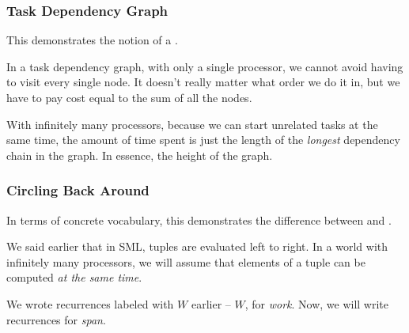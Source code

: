 \documentclass[aspectratio=169]{beamer}
\begin{document}
\begin{frame}[fragile]
  \frametitle{ Task Dependency Graph }

  This demonstrates the notion of a .

  \pause
  \vspace{\fill}


  \pause
  \vspace{\fill}

  In a task dependency graph, with only a single processor, we cannot avoid having to visit every single
  node. It doesn't really matter what order we do it in, but we have to pay cost equal to the sum of all
  the nodes.

  \pause
  \vspace{\fill}

  With infinitely many processors, because we can start unrelated tasks at the same time, the amount of time
  spent is just the length of the \textit{longest} dependency chain in the graph. In essence, the height
  of the graph.
\end{frame}

\begin{frame}[fragile]
  \frametitle{ Circling Back Around }

  In terms of concrete vocabulary, this demonstrates the difference between  and .

  \pause
  \vspace{\fill}


  \pause
  \vspace{\fill}


  \pause
  \vspace{\fill}

  We said earlier that in SML, tuples are evaluated left to right. In a world with infinitely many processors, we
  will assume that elements of a tuple can be computed \textit{at the same time}.


  \pause
  \vspace{\fill}

  We wrote recurrences labeled with $W$ earlier -- $W$, for \textit{work}. Now, we will write recurrences for \textit{span}.
\end{frame}
\end{document}
